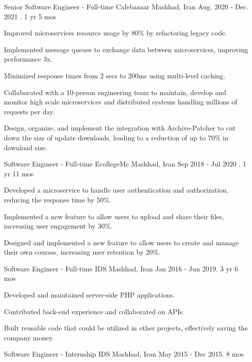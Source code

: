 \begin{cventries}
    \cventry
    {Senior Software Engineer - Full-time}
    {Cafebazaar}
    {Mashhad, Iran}
    {Aug. 2020 - Dec. 2021 . 1 yr 5 mos}
    {
        \begin{cvitems}
            \item { Improved microservices resource usage by 80\% by refactoring legacy code.}
            \item { Implemented message queues to exchange data between microservices, improving performance 3x.}
            \item { Minimized response times from 2 secs to 200ms using multi-level caching.}
            \item { Collaborated with a 10-person engineering team to maintain, develop and monitor high scale microservices and distributed systems handling millions of requests per day.}
            \item { Design, organize, and implement the integration with Archive-Patcher to cut down the size of update downloads, leading to a reduction of up to 70\% in download size.}
        \end{cvitems}
    }

    \cventry
    {Software Engineer - Full-time}
    {EcollegeMe}
    {Mashhad, Iran}
    {Sep 2018 - Jul 2020 . 1 yr 11 mos}
    {
        \begin{cvitems}
            \item { Developed a microservice to handle user authentication and authorization, reducing the response time by 50\%.}
            \item { Implemented a new feature to allow users to upload and share their files, increasing user engagement by 30\%.}
            \item { Designed and implemented a new feature to allow users to create and manage their own courses, increasing user retention by 20\%.}
        \end{cvitems}
    }

    \cventry
    {Software Engineer - Full-time}
    {IDS}
    {Mashhad, Iran}
    {Jan 2016 - Jun 2019. 3 yr 6 mos}
    {
        \begin{cvitems}
            \item { Developed and maintained server-side PHP applications.}
            \item { Contributed back-end experience and collaborated on APIs.}
            \item { Built reusable code that could be utilized in other projects, effectively saving the company money.}
        \end{cvitems}
    }
    \cventry
    {Software Engineer - Internship}
    {IDS}
    {Mashhad, Iran}
    {May 2015 - Dec 2015. 8 mos}
    {}
\end{cventries}